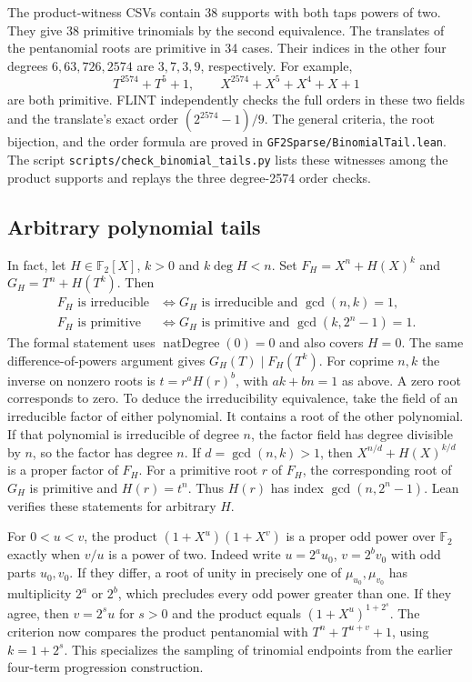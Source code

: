 \documentclass[11pt]{article}
\newcommand{\F}{\mathbb F_2}
\begin{document}
The product-witness CSVs contain 38 supports with both taps powers of
two. They give 38 primitive trinomials by the second equivalence.
The translates of the pentanomial roots are primitive in 34 cases.
Their indices in the other four degrees \(6,63,726,2574\) are
\(3,7,3,9\), respectively. For example,
\[
 T^{2574}+T^5+1,\qquad X^{2574}+X^5+X^4+X+1
\]
are both primitive. FLINT independently checks the full orders in
these two fields and the translate's exact order \((2^{2574}-1)/9\).
The general criteria, the root bijection, and the order formula are
proved in \nolinkurl{GF2Sparse/BinomialTail.lean}. The script
\nolinkurl{scripts/check_binomial_tails.py} lists these witnesses among the product supports
and replays the three degree-2574 order checks.

\subsection*{Arbitrary polynomial tails}
In fact, let \(H\in\F[X]\), \(k>0\) and \(k\deg H<n\).
Set \(F_H=X^n+H(X)^k\) and \(G_H=T^n+H(T^k)\).
Then
\begin{align*}
 F_H\text{ is irreducible}
     &\iff G_H\text{ is irreducible and }\gcd(n,k)=1,\\
 F_H\text{ is primitive}
     &\iff G_H\text{ is primitive and }\gcd(k,2^n-1)=1 .
\end{align*}
The formal statement uses \(\operatorname{natDegree}(0)=0\) and
also covers \(H=0\).
The same difference-of-powers argument gives \(G_H(T)\mid F_H(T^k)\).
For coprime \(n,k\) the inverse on nonzero roots is
\(t=r^aH(r)^b\), with \(ak+bn=1\) as above. A zero root corresponds
to zero. To deduce the irreducibility equivalence, take the field of
an irreducible factor of either polynomial. It contains a root of the
other polynomial. If that polynomial is irreducible of degree \(n\),
the factor field has degree divisible by \(n\), so the factor has
degree \(n\). If \(d=\gcd(n,k)>1\), then
\(X^{n/d}+H(X)^{k/d}\) is a proper factor of \(F_H\).
For a primitive root \(r\) of \(F_H\), the corresponding root of
\(G_H\) is primitive and \(H(r)=t^n\). Thus \(H(r)\) has index
\(\gcd(n,2^n-1)\). Lean verifies these statements for arbitrary \(H\).

For \(0<u<v\), the product \((1+X^u)(1+X^v)\) is a proper odd
power over \(\F\) exactly when \(v/u\) is a power of two.
Indeed write \(u=2^a u_0\), \(v=2^b v_0\) with odd parts
\(u_0,v_0\). If they differ, a root of unity in precisely one of
\(\mu_{u_0},\mu_{v_0}\) has multiplicity \(2^a\) or \(2^b\), which
precludes every odd power greater than one. If they agree, then
\(v=2^s u\) for \(s>0\) and the product equals \((1+X^u)^{1+2^s}\).
The criterion now compares the product pentanomial with
\(T^n+T^{u+v}+1\), using \(k=1+2^s\).
This specializes the sampling of trinomial endpoints from the earlier
four-term progression construction.
\end{document}
